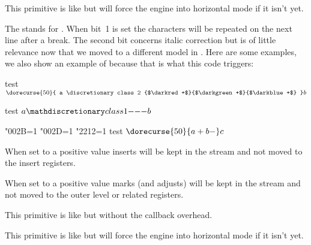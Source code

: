 \startoldprimitive[title={\prm {hkern}}]

This primitive is like  but will force the engine into horizontal mode
if it isn't yet.

\stopoldprimitive

\startnewprimitive[title={\prm {hmcode}}]

The  stands for . When bit~1 is set the
characters will be repeated on the next line after a break. The second bit
concerns italic correction but is of little relevance now that we moved to a
different model in \CONTEXT. Here are some examples, we also show an example of
 because that is what this code triggers:

\startbuffer
test $ \dorecurse {50} {
    a \discretionary class 2 {$\darkred +$}{$\darkgreen +$}{$\darkblue +$}
} b$

test $ a \mathdiscretionary class 1 {-}{-}{-} b$

\bgroup
    \hmcode"002B=1 %
    \hmcode"002D=1 %
    \hmcode"2212=1 %
    test $ \dorecurse{50}{a + b - } c$
\egroup
\stopbuffer

\typebuffer

{\getbuffer}

\stopnewprimitive

\startoldprimitive[title={\prm {holdinginserts}}]

When set to a positive value inserts will be kept in the stream and not moved to
the insert registers.

\stopoldprimitive

\startnewprimitive[title={\prm {holdingmigrations}}]

When set to a positive value marks (and adjusts) will be kept in the stream and
not moved to the outer level or related registers.

\stopnewprimitive

\startnewprimitive[title={\prm {hpack}}]

This primitive is like  but without the callback overhead.

\stopnewprimitive

\startnewprimitive[title={\prm {hpenalty}}]

This primitive is like  but will force the engine into horizontal
mode if it isn't yet.

\stopnewprimitive

\startoldprimitive[title={\prm {hrule}}]

